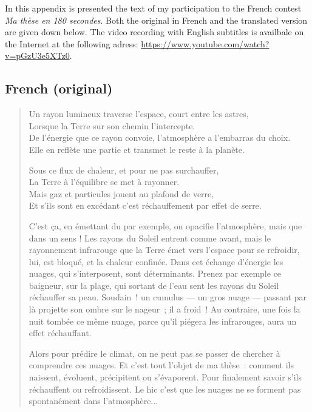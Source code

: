 \label{annex:MT180}


In this appendix is presented the text of my participation to the French contest \textit{Ma thèse en 180 secondes}. Both the original in French and the translated version are given down below.
The video recording with English subtitles is availbale on the Internet at the following adress: \url{https://www.youtube.com/watch?v=pGzU3e5XTz0}.


    \subsection*{French (original)}
\begin{quote}    
    Un rayon lumineux traverse l’espace, court entre les astres,\\
    Lorsque la Terre sur son chemin l’intercepte.\\ 
    De l’énergie que ce rayon convoie, l’atmosphère a l’embarras du choix.\\ 
    Elle en reflète une partie et transmet le reste à la planète.\ 
    
    Sous ce flux de chaleur, et pour ne pas surchauffer,\\
    La Terre à l’équilibre se met à rayonner.\\ 
    Mais gaz et particules jouent au plafond de verre,\\ 
    Et s’ils sont en excédant c’est réchauffement par effet de serre.\
    
        C’est ça, en émettant du  par exemple, on opacifie l’atmosphère, mais que dans un sens ! Les rayons du Soleil entrent comme avant, mais le rayonnement infrarouge que la Terre émet vers l’espace pour se refroidir, lui, est bloqué, et la chaleur confinée.
    Dans cet échange d’énergie les nuages, qui s’interposent, sont déterminants. 
    Prenez par exemple ce baigneur, sur la plage, qui sortant de l’eau sent les rayons du Soleil réchauffer sa peau. Soudain ! un cumulus — un gros nuage — passant par là projette son ombre sur le nageur ; il a froid !
    Au contraire, une fois la nuit tombée ce même nuage, parce qu’il piégera les infrarouges, aura un effet réchauffant.\
    
    Alors pour prédire le climat, on ne peut pas se passer de chercher à comprendre ces nuages. Et c’est tout l’objet de ma thèse : comment ils naissent, évoluent, précipitent ou s’évaporent. Pour finalement savoir s’ils réchauffent ou refroidissent.
    Le hic c’est  que les nuages ne se forment pas spontanément dans l’atmosphère...\
    

\end{quote}
